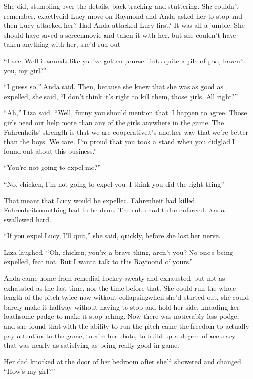 She did, stumbling over the details, back-tracking and stuttering.
She couldn’t remember, exactly\dash{}did Lucy move on Raymond and Anda
asked her to stop and then Lucy attacked her? Had Anda attacked
Lucy first? It was all a jumble. She should have saved a
screenmovie and taken it with her, but she couldn’t have taken
anything with her, she’d run out\dash{}

“I see. Well it sounds like you’ve gotten yourself into quite a
pile of poo, haven’t you, my girl?”

“I guess so,” Anda said. Then, because she knew that she was as
good as expelled, she said, “I don’t think it’s right to kill them,
those girls. All right?”

“Ah,” Liza said. “Well, funny you should mention that. I happen to
agree. Those girls need our help more than any of the girls
anywhere in the game. The Fahrenheits’ strength is that we are
cooperative\dash{}it’s another way that we’re better than the boys. We
care. I’m proud that you took a stand when you did\dash{}glad I found out
about this business.”

“You’re not going to expel me?”

“No, chicken, I’m not going to expel you. I think you did the right
thing\dash{}”

That meant that Lucy would be expelled. Fahrenheit had killed
Fahrenheit\dash{}something had to be done. The rules had to be enforced.
Anda swallowed hard.

“If you expel Lucy, I’ll quit,” she said, quickly, before she lost
her nerve.

Liza laughed. “Oh, chicken, you’re a brave thing, aren’t you? No
one’s being expelled, fear not. But I wanta talk to this Raymond of
yours.”

\tb

Anda came home from remedial hockey sweaty and exhausted, but not
as exhausted as the last time, nor the time before that. She could
run the whole length of the pitch twice now without collapsing\dash{}when
she’d started out, she could barely make it halfway without having
to stop and hold her side, kneading her loathsome podge to make it
stop aching. Now there was noticeably less podge, and she found
that with the ability to run the pitch came the freedom to actually
pay attention to the game, to aim her shots, to build up a degree
of accuracy that was nearly as satisfying as being really good
in-game.

Her dad knocked at the door of her bedroom after she’d showered and
changed. “How’s my girl?”

